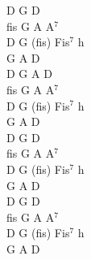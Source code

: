 \documentclass[a5paper, 10pt]{book}
\begin{document}
\begin{minipage}[t]{0.3\textwidth}
  D G D\\
  fis G A A$^7$\\
  D G (fis) Fis$^7$ h\\
  G A D\\

  D G A D\\
  fis G A A$^7$\\
  D G (fis) Fis$^7$ h\\
  G A D\\

  D G D\\
  fis G A A$^7$\\
  D G (fis) Fis$^7$ h\\
  G A D\\

  D G D\\
  fis G A A$^7$\\
  D G (fis) Fis$^7$ h\\
  G A D\\
\end{minipage}

\newpage
\end{document}
